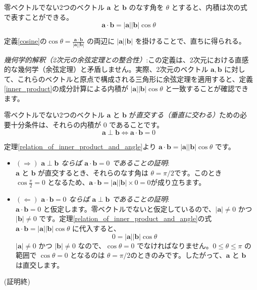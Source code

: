 \begin{thm}[内積とベクトルのなす角の関係] \label{relation_of_inner_product_and_angle}
零ベクトルでない2つのベクトル $\bm{a}$ と $\bm{b}$ のなす角を $\theta$ とすると、内積は次の式で表すことができる。
\[\bm{a} \cdot \bm{b} = |\bm{a}| |\bm{b}| \cos\theta\]
\begin{proof*}
定義\ref{cosine}の$\cos\theta = \frac{\bm{a} \cdot \bm{b}}{|\bm{a}| |\bm{b}|}$ の両辺に $|\bm{a}| |\bm{b}|$ を掛けることで、直ちに得られる。
\end{proof*}
\end{thm}

\emph{幾何学的解釈（2次元の余弦定理との整合性）}:この定義は、2次元における直感的な幾何学（余弦定理）と矛盾しません。実際、2次元のベクトル $\bm{a}, \bm{b}$ に対して、これらのベクトルと原点で構成される三角形に余弦定理を適用すると、定義\ref{inner_product}の成分計算による内積が $|\bm{a}||\bm{b}|\cos\theta$ と一致することが確認できます。

\begin{thm}[ベクトルの直交条件] \label{orthogonality_condition}
零ベクトルでない2つのベクトル $\bm{a}$ と $\bm{b}$ が\emph{直交する（垂直に交わる）}ための必要十分条件は、それらの内積が $0$ であることです。
\[\bm{a} \perp \bm{b} \iff \bm{a} \cdot \bm{b} = 0\]
\begin{proof*}
定理\ref{relation_of_inner_product_and_angle}より $\bm{a} \cdot \bm{b} = |\bm{a}| |\bm{b}| \cos\theta$ です。
\begin{itemize}
\item \emph{$(\Rightarrow)$ $\bm{a} \perp \bm{b}$ ならば $\bm{a} \cdot \bm{b} = 0$ であることの証明}:\\
    $\bm{a}$ と $\bm{b}$ が直交するとき、それらのなす角は $\theta = \pi/2$です。このとき $\cos\frac{\pi}{2} = 0$ となるため、$\bm{a} \cdot \bm{b} = |\bm{a}| |\bm{b}| \times 0 = 0$が成り立ちます。
\item \emph{$(\Leftarrow)$ $\bm{a} \cdot \bm{b} = 0$ ならば $\bm{a} \perp \bm{b}$ であることの証明}:\\
    $\bm{a} \cdot \bm{b} = 0$ と仮定します。零ベクトルでないと仮定しているので、$|\bm{a}| \neq 0$ かつ $|\bm{b}| \neq 0$ です。定理\ref{relation_of_inner_product_and_angle}の式 $\bm{a} \cdot \bm{b} = |\bm{a}| |\bm{b}| \cos\theta$ に代入すると、
    \[0 = |\bm{a}| |\bm{b}| \cos\theta\]
    $|\bm{a}| \neq 0$ かつ $|\bm{b}| \neq 0$ なので、$\cos\theta = 0$ でなければなりません。$0 \le \theta \le \pi$ の範囲で $\cos\theta = 0$ となるのは $\theta = \pi/2$のときのみです。したがって、$\bm{a}$ と $\bm{b}$ は直交します。
\end{itemize}
(証明終)
\end{proof*}
\end{thm}

